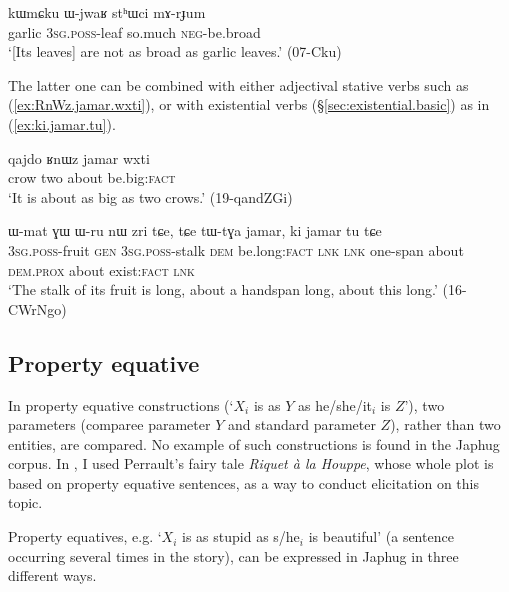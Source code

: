 \begin{exe}
\ex \label{ex:sthWci.mArJum}
\gll kɯmɕku ɯ-jwaʁ stʰɯci mɤ-rɟum \\
garlic \textsc{3sg}.\textsc{poss}-leaf so.much \textsc{neg}-be.broad \\
\glt `[Its leaves] are not as broad as garlic leaves.' (07-Cku)
\end{exe}

The latter one   can be combined with either adjectival stative verbs such as  (\ref{ex:RnWz.jamar.wxti}), or with existential verbs (§\ref{sec:existential.basic}) as in (\ref{ex:ki.jamar.tu}).
 
\begin{exe}
\ex \label{ex:RnWz.jamar.wxti}
\gll qajdo ʁnɯz jamar wxti \\
crow two about be.big:\textsc{fact} \\
\glt `It is about as big as two crows.' (19-qandZGi)
\end{exe}

\begin{exe}
\ex \label{ex:ki.jamar.tu}
\gll ɯ-mat ɣɯ ɯ-ru nɯ zri tɕe, tɕe tɯ-tɣa jamar, ki jamar tu tɕe \\
\textsc{3sg}.\textsc{poss}-fruit \textsc{gen} \textsc{3sg}.\textsc{poss}-stalk \textsc{dem} be.long:\textsc{fact} \textsc{lnk} \textsc{lnk} one-span about \textsc{dem}.\textsc{prox} about exist:\textsc{fact} \textsc{lnk} \\
\glt `The stalk of its fruit is long, about a handspan long, about this long.' (16-CWrNgo)
\end{exe}
 

\subsection{Property equative}
In property equative constructions (`$X_i$ is as $Y$ as he/she/it$_i$ is $Z$'),  two parameters (comparee parameter $Y$ and standard parameter $Z$), rather than two entities, are compared. No example of such constructions is found in the Japhug corpus. In \citet{jacques18similative}, I used Perrault's fairy tale \textit{Riquet à la Houppe}, whose whole plot is based on property equative sentences, as a way to conduct elicitation on this topic.

Property equatives, e.g. `$X_i$ is as stupid as s/he$_i$ is beautiful' (a sentence occurring several times in the story), can be expressed in Japhug in three different ways.

